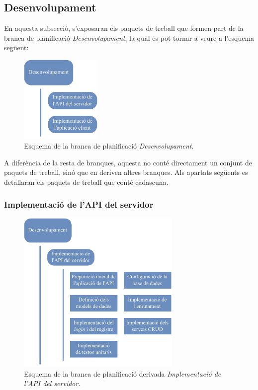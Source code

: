 \documentclass[a4paper,12pt]{ThesisStyle}
\begin{document}
\subsection{Desenvolupament}
\label{subsec:desenvolupament}

En aquesta subsecció, s'exposaran els paquets de treball que formen part de la branca de planificació \emph{Desenvolupament}, la qual es pot tornar a veure a l'esquema següent:

\begin{figure}[H]
	\centering
	\includegraphics[width=0.35\textwidth]{assets/working_packages/desenvolupament/general.pdf}
	\caption{\label{img:pt_desenvolupament}Esquema de la branca de planificació \emph{Desenvolupament}.}
\end{figure}

A diferència de la resta de branques, aquesta no conté directament un conjunt de paquets de treball, sinó que en deriven altres branques. Als apartats següents es detallaran els paquets de treball que conté cadascuna.

\subsubsection{Implementació de l'API del servidor}
\label{subsubsec:implementacio_api}

\begin{figure}[H]
	\centering
	\includegraphics[width=0.7\textwidth]{assets/working_packages/desenvolupament/implementacioAPI.pdf}
	\caption{\label{img:pt_implementacio_api}Esquema de la branca de planificació derivada \emph{Implementació de l'API del servidor}.}
\end{figure}
\end{document}
